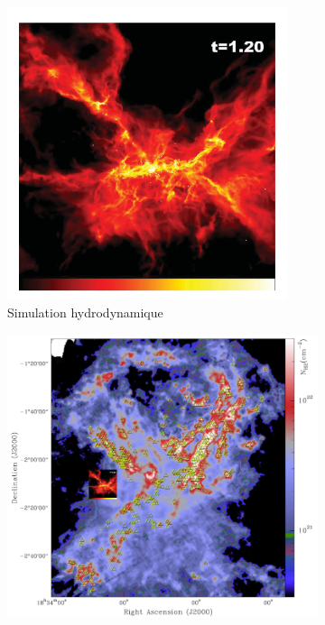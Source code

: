 \begin{figure}
\center
    \centering
    \begin{subfigure}[b]{0.48\textwidth}
    	\centering
        \includegraphics[width=0.9\textwidth]{Figures/0_bate2012.png}
        \caption{Simulation hydrodynamique}
        \label{Fig:resume_bate2012}
    \end{subfigure}
    \begin{subfigure}[b]{0.48\textwidth}
        \includegraphics[width=\textwidth]{Figures/0_aquila_bate.png}

\end{subfigure}
\end{figure}
